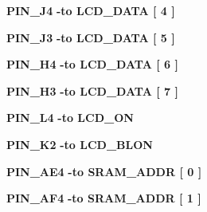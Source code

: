\begin{DoxyCompactItemize}
\item 
{\bf P\+I\+N\+\_\+\+J4} {\bfseries \textcolor{vhdlchar}{-\/}\textcolor{keywordflow}{to}\textcolor{vhdlchar}{ }\textcolor{vhdlchar}{L\+C\+D\+\_\+\+D\+A\+TA}\textcolor{vhdlchar}{ }\textcolor{vhdlchar}{[}\textcolor{vhdlchar}{ } \textcolor{vhdldigit}{4} \textcolor{vhdlchar}{ }\textcolor{vhdlchar}{]}\textcolor{vhdlchar}{ }} 
\item 
{\bf P\+I\+N\+\_\+\+J3} {\bfseries \textcolor{vhdlchar}{-\/}\textcolor{keywordflow}{to}\textcolor{vhdlchar}{ }\textcolor{vhdlchar}{L\+C\+D\+\_\+\+D\+A\+TA}\textcolor{vhdlchar}{ }\textcolor{vhdlchar}{[}\textcolor{vhdlchar}{ } \textcolor{vhdldigit}{5} \textcolor{vhdlchar}{ }\textcolor{vhdlchar}{]}\textcolor{vhdlchar}{ }} 
\item 
{\bf P\+I\+N\+\_\+\+H4} {\bfseries \textcolor{vhdlchar}{-\/}\textcolor{keywordflow}{to}\textcolor{vhdlchar}{ }\textcolor{vhdlchar}{L\+C\+D\+\_\+\+D\+A\+TA}\textcolor{vhdlchar}{ }\textcolor{vhdlchar}{[}\textcolor{vhdlchar}{ } \textcolor{vhdldigit}{6} \textcolor{vhdlchar}{ }\textcolor{vhdlchar}{]}\textcolor{vhdlchar}{ }} 
\item 
{\bf P\+I\+N\+\_\+\+H3} {\bfseries \textcolor{vhdlchar}{-\/}\textcolor{keywordflow}{to}\textcolor{vhdlchar}{ }\textcolor{vhdlchar}{L\+C\+D\+\_\+\+D\+A\+TA}\textcolor{vhdlchar}{ }\textcolor{vhdlchar}{[}\textcolor{vhdlchar}{ } \textcolor{vhdldigit}{7} \textcolor{vhdlchar}{ }\textcolor{vhdlchar}{]}\textcolor{vhdlchar}{ }} 
\item 
{\bf P\+I\+N\+\_\+\+L4} {\bfseries \textcolor{vhdlchar}{-\/}\textcolor{keywordflow}{to}\textcolor{vhdlchar}{ }\textcolor{vhdlchar}{L\+C\+D\+\_\+\+ON}\textcolor{vhdlchar}{ }} 
\item 
{\bf P\+I\+N\+\_\+\+K2} {\bfseries \textcolor{vhdlchar}{-\/}\textcolor{keywordflow}{to}\textcolor{vhdlchar}{ }\textcolor{vhdlchar}{L\+C\+D\+\_\+\+B\+L\+ON}\textcolor{vhdlchar}{ }} 
\item 
{\bf P\+I\+N\+\_\+\+A\+E4} {\bfseries \textcolor{vhdlchar}{-\/}\textcolor{keywordflow}{to}\textcolor{vhdlchar}{ }\textcolor{vhdlchar}{S\+R\+A\+M\+\_\+\+A\+D\+DR}\textcolor{vhdlchar}{ }\textcolor{vhdlchar}{[}\textcolor{vhdlchar}{ } \textcolor{vhdldigit}{0} \textcolor{vhdlchar}{ }\textcolor{vhdlchar}{]}\textcolor{vhdlchar}{ }} 
\item 
{\bf P\+I\+N\+\_\+\+A\+F4} {\bfseries \textcolor{vhdlchar}{-\/}\textcolor{keywordflow}{to}\textcolor{vhdlchar}{ }\textcolor{vhdlchar}{S\+R\+A\+M\+\_\+\+A\+D\+DR}\textcolor{vhdlchar}{ }\textcolor{vhdlchar}{[}\textcolor{vhdlchar}{ } \textcolor{vhdldigit}{1} \textcolor{vhdlchar}{ }\textcolor{vhdlchar}{]}\textcolor{vhdlchar}{ }} 

\end{DoxyCompactItemize}
